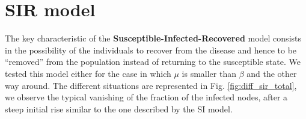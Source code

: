 
\section{SIR model} %
\label{sec:sir_model}
    The key characteristic of the \textbf{Susceptible-Infected-Recovered} model consists in the possibility
    of the individuals to recover from the disease and hence to be ``removed'' from the population instead of returning to the susceptible state.
    We tested this model either for the case in which $\mu$ is smaller than $\beta$ and the other way around.
    The different situations are represented in Fig. \ref{fig:diff_sir_total}, we observe the typical vanishing of the fraction of the infected nodes, after a steep initial rise similar to the one described by the SI model.

